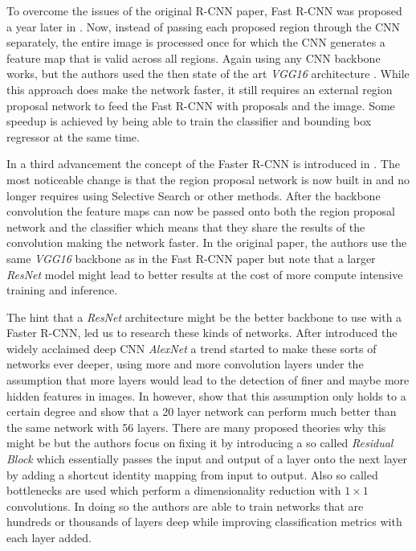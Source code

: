 To overcome the issues of the original \ac{R-CNN} paper, Fast \ac{R-CNN} was proposed a year later in \autocite{girshick_fast_2015}. Now, instead of passing each proposed region through the CNN separately, the entire image is processed once for which the \ac{CNN} generates a feature map that is valid across all regions. Again using any \ac{CNN} backbone works, but the authors used the then state of the art \textit{VGG16} architecture \autocite{simonyan_very_2015}. While this approach does make the network faster, it still requires an external region proposal network to feed the Fast \ac{R-CNN} with proposals and the image. Some speedup is achieved by being able to train the classifier and bounding box regressor at the same time.

In a third advancement the concept of the Faster \ac{R-CNN} is introduced in \autocite{ren_faster_2016}. The most noticeable change is that the region proposal network is now built in and no longer requires using Selective Search or other methods. After the backbone convolution the feature maps can now be passed onto both the region proposal network and the classifier which means that they share the results of the convolution making the network faster. In the original paper, the authors use the same \textit{VGG16} backbone as in the Fast \ac{R-CNN} paper but note that a larger \textit{ResNet}\autocite{he_deep_2015} model might lead to better results at the cost of more compute intensive training and inference.

The hint that a \textit{ResNet} architecture might be the better backbone to use with a Faster \ac{R-CNN}, led us to research these kinds of networks. After \citeauthor{krizhevsky_imagenet_2017} introduced the widely acclaimed deep \ac{CNN} \textit{AlexNet} a trend started to make these sorts of networks ever deeper, using more and more convolution layers under the assumption that more layers would lead to the detection of finer and maybe more hidden features in images. In \autocite{he_deep_2015} however, \citeauthor{he_deep_2015} show that this assumption only holds to a certain degree and show that a 20 layer network can perform much better than the same network with 56 layers. There are many proposed theories why this might be but the authors focus on fixing it by introducing a so called \textit{Residual Block} which essentially passes the input and output of a layer onto the next layer by adding a shortcut identity mapping from input to output.  Also so called bottlenecks are used which perform a dimensionality reduction with $1 \times 1$ convolutions. In doing so the authors are able to train networks that are hundreds or thousands of layers deep while improving classification metrics with each layer added.

